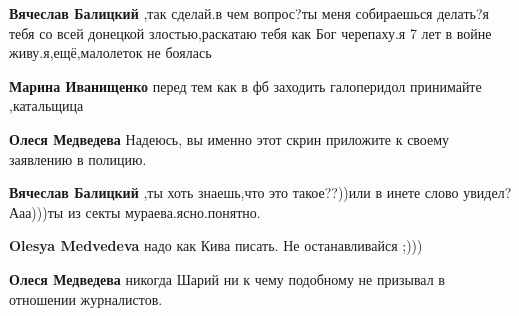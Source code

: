 \begin{itemize}
\textbf{Вячеслав Балицкий} ,так сделай.в чем вопрос?ты меня собираешься делать?я тебя со всей донецкой злостью,раскатаю тебя как Бог черепаху.я 7 лет в войне живу.я,ещё,малолеток не боялась

 
\textbf{Марина Иванищенко} перед тем как в фб заходить галоперидол принимайте ,катальщица

 
\textbf{Олеся Медведева} Надеюсь, вы именно этот скрин приложите к своему заявлению в полицию.

 
\textbf{Вячеслав Балицкий} ,ты хоть знаешь,что это такое??))или в инете слово увидел?Ааа)))ты из секты мураева.ясно.понятно.

 
\textbf{Olesya Medvedeva} надо как Кива писать. Не останавливайся ;)))

 
\textbf{Олеся Медведева} никогда Шарий ни к чему подобному не призывал в отношении журналистов.

 

\end{itemize}
